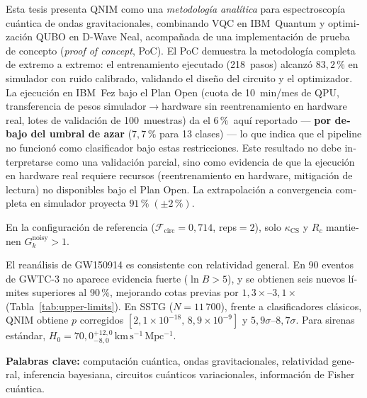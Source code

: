 \documentclass[11pt,a4paper, english]{book}
\theoremstyle{plain}
\theoremstyle{definition}
\numberwithin{equation}{chapter}
\numberwithin{figure}{chapter}
\numberwithin{table}{chapter}
\begin{document}
\begin{otherlanguage}{spanish}
Esta tesis presenta QNIM como una \emph{metodología analítica} para 
espectroscop\'{i}a cu\'{a}ntica de ondas gravitacionales, combinando VQC en
IBM~Quantum y optimizaci\'{o}n QUBO en D-Wave Neal, acompañada 
de una implementación de prueba de concepto (\textit{proof of concept}, PoC).
El PoC demuestra la metodolog\'{i}a completa de extremo a extremo:
el entrenamiento ejecutado (218~pasos) alcanzó $83{,}2\,\%$ en simulador 
con ruido calibrado, validando el diseño del circuito y el optimizador.
La ejecución en IBM~Fez bajo el Plan Open 
(cuota de 10~min/mes de QPU, transferencia de pesos 
simulador$\to$hardware sin reentrenamiento en hardware real, 
lotes de validaci\'{o}n de 100~muestras) da el $6\,\%$~aquí reportado
--- \textbf{por debajo del umbral de azar} ($7{,}7\,\%$ para 13 clases)
--- lo que indica que el pipeline no funcionó como clasificador bajo
estas restricciones. Este resultado no debe interpretarse como una
validación parcial, sino como evidencia de que la ejecución en
hardware real requiere recursos (reentrenamiento en hardware,
mitigación de lectura) no disponibles bajo el Plan Open.
La extrapolaci\'{o}n a convergencia completa en simulador proyecta
$91\,\%\;(\pm2\,\%)$.

En la configuración de referencia ($\mathcal{F}_\mathrm{circ}=0{,}714$, reps${=}2$), solo
$\kappa_\mathrm{CS}$ y $R_c$ mantienen $G_k^\mathrm{noisy}>1$.

El rean\'{a}lisis de GW150914 es consistente con relatividad general.
En 90 eventos de GWTC-3 no aparece evidencia fuerte
($\ln B>5$), y se obtienen seis nuevos l\'{i}mites superiores al
90\,\%, mejorando cotas previas por $1{,}3\times$--$3{,}1\times$
(Tabla~\ref{tab:upper-limits}). En SSTG ($N=11\,700$), frente a
clasificadores cl\'{a}sicos, QNIM obtiene $p$ corregidos
$[2{,}1\times10^{-18},\,8{,}9\times10^{-9}]$ y
$5{,}9\sigma$--$8{,}7\sigma$. Para sirenas est\'{a}ndar,
$H_0=70{,}0^{+12{,}0}_{-8{,}0}\,\mathrm{km\,s^{-1}\,Mpc^{-1}}$.

\vspace{0.4cm}
\textbf{Palabras clave:} computaci\'{o}n cu\'{a}ntica, ondas
gravitacionales, relatividad general,
inferencia bayesiana, circuitos cu\'{a}nticos variacionales,
informaci\'{o}n de Fisher cu\'{a}ntica.
\end{otherlanguage}


\end{document}
